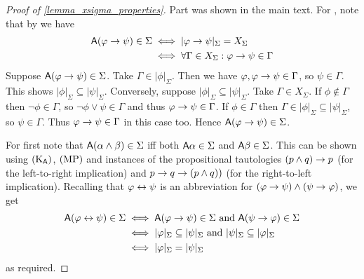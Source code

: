 \begin{proof}[Proof of \cref{lemma_xsigma_properties}]

        Part  was shown in the main text. For
        , note that by  we
        have
        \[
        \begin{aligned}
            \mathsf{A}(\varphi \to \psi) \in \Sigma
            &\iff |\varphi \to \psi|_\Sigma = X_\Sigma \\
            &\iff \forall \Gamma \in X_\Sigma: \varphi \to \psi \in
                \Gamma
        \end{aligned}
        \]
        Suppose $\mathsf{A}(\varphi \to \psi) \in \Sigma$. Take $\Gamma \in
        |\phi|_\Sigma$. Then we have $\varphi, \varphi \to \psi \in
        \Gamma$, so $\psi \in \Gamma$. This shows $|\phi|_\Sigma
        \subseteq |\psi|_\Sigma$.
        Conversely, suppose $|\phi|_\Sigma \subseteq |\psi|_\Sigma$.
        Take $\Gamma \in X_\Sigma$. If $\phi \notin \Gamma$ then
        $\neg\phi \in \Gamma$, so $\neg\phi \lor \psi \in \Gamma$ and
        thus $\varphi \to \psi \in \Gamma$. If $\phi \in \Gamma$
        then $\Gamma \in |\phi|_\Sigma \subseteq |\psi|_\Sigma$, so
        $\psi \in \Gamma$. Thus $\varphi \to \psi \in \Gamma$ in
        this case too. Hence $\mathsf{A}(\varphi \to \psi) \in \Sigma$.

       For  first note that $\mathsf{A}(\alpha \land \beta)
       \in \Sigma$ iff both $\mathsf{A}\alpha \in \Sigma$ and $\mathsf{A}\beta \in \Sigma$.
       This can be shown using $(\text{K}_{\mathsf{A}})$, $(\text{MP})$ and instances of the
       propositional tautologies $(p \land q) \to p$ (for the
       left-to-right implication) and $p \to q \to (p \land q))$
       (for the right-to-left implication).
        Recalling that $\varphi \leftrightarrow \psi$ is an abbreviation for $(\varphi
        \to \psi) \land (\psi \to \varphi)$, we get
        \[
        \begin{aligned}
            \mathsf{A}(\varphi \leftrightarrow \psi) \in \Sigma
            &\iff \mathsf{A}(\varphi \to \psi) \in \Sigma \text{ and }
                \mathsf{A}(\psi \to \varphi) \in \Sigma \\
            &\iff |\varphi|_\Sigma \subseteq |\psi|_\Sigma \text { and }
                |\psi|_\Sigma \subseteq |\varphi|_\Sigma \\
            & \iff |\varphi|_\Sigma = |\psi|_\Sigma
        \end{aligned}
        \]
        as required.

\end{proof}

